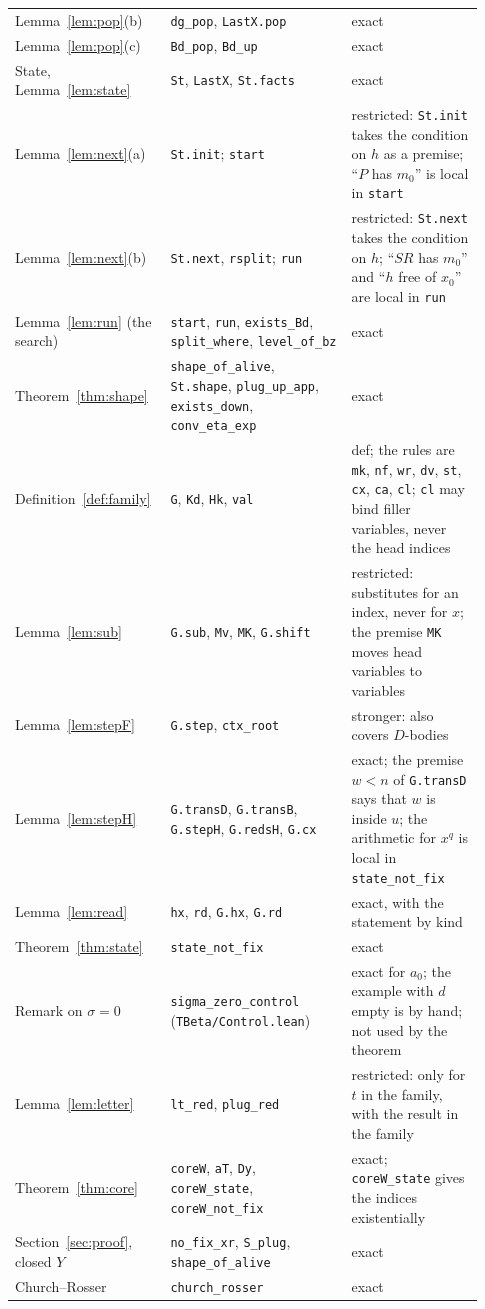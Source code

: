 \documentclass[a4paper,english]{lipics-v2021}
\newcommand{\lean}[1]{\texttt{#1}}
\begin{document}
{\begin{longtable}{@{}p{0.29\linewidth}p{0.37\linewidth}p{0.27\linewidth}@{}}
Lemma~\ref{lem:pop}(b) & \lean{dg\_pop}, \lean{LastX.pop} & exact\\
Lemma~\ref{lem:pop}(c) & \lean{Bd\_pop}, \lean{Bd\_up} & exact\\
State, Lemma~\ref{lem:state} & \lean{St}, \lean{LastX}, \lean{St.facts} & exact\\
Lemma~\ref{lem:next}(a) & \lean{St.init}; \lean{start} & restricted: \lean{St.init} takes the condition on $h$ as a premise; ``$P$ has $m_0$'' is local in \lean{start}\\
Lemma~\ref{lem:next}(b) & \lean{St.next}, \lean{rsplit}; \lean{run} & restricted: \lean{St.next} takes the condition on $h$; ``$SR$ has $m_0$'' and ``$h$ free of $x_0$'' are local in \lean{run}\\
Lemma~\ref{lem:run} (the search) & \lean{start}, \lean{run}, \lean{exists\_Bd}, \lean{split\_where}, \lean{level\_of\_bz} & exact\\
Theorem~\ref{thm:shape} & \lean{shape\_of\_alive}, \lean{St.shape}, \lean{plug\_up\_app}, \lean{exists\_down}, \lean{conv\_eta\_exp} & exact\\
Definition~\ref{def:family} & \lean{G}, \lean{Kd}, \lean{Hk}, \lean{val} & def; the rules are \lean{mk}, \lean{nf}, \lean{wr}, \lean{dv}, \lean{st}, \lean{cx}, \lean{ca}, \lean{cl}; \lean{cl} may bind filler variables, never the head indices\\
Lemma~\ref{lem:sub} & \lean{G.sub}, \lean{Mv}, \lean{MK}, \lean{G.shift} & restricted: substitutes for an index, never for $x$; the premise \lean{MK} moves head variables to variables\\
Lemma~\ref{lem:stepF} & \lean{G.step}, \lean{ctx\_root} & stronger: also covers $D$-bodies\\
Lemma~\ref{lem:stepH} & \lean{G.transD}, \lean{G.transB}, \lean{G.stepH}, \lean{G.redsH}, \lean{G.cx} & exact; the premise $w < n$ of \lean{G.transD} says that $w$ is inside $u$; the arithmetic for $x^q$ is local in \lean{state\_not\_fix}\\
Lemma~\ref{lem:read} & \lean{hx}, \lean{rd}, \lean{G.hx}, \lean{G.rd} & exact, with the statement by kind\\
Theorem~\ref{thm:state} & \lean{state\_not\_fix} & exact\\
Remark on $\sigma = 0$ & \lean{sigma\_zero\_control} (\lean{TBeta/Control.lean}) & exact for $a_0$; the example with $d$ empty is by hand; not used by the theorem\\
Lemma~\ref{lem:letter} & \lean{lt\_red}, \lean{plug\_red} & restricted: only for $t$ in the family, with the result in the family\\
Theorem~\ref{thm:core} & \lean{coreW}, \lean{aT}, \lean{Dy}, \lean{coreW\_state}, \lean{coreW\_not\_fix} & exact; \lean{coreW\_state} gives the indices existentially\\
Section~\ref{sec:proof}, closed $Y$ & \lean{no\_fix\_xr}, \lean{S\_plug}, \lean{shape\_of\_alive} & exact\\
Church--Rosser & \lean{church\_rosser} & exact\\
\bottomrule
\end{longtable}
}
\end{document}
